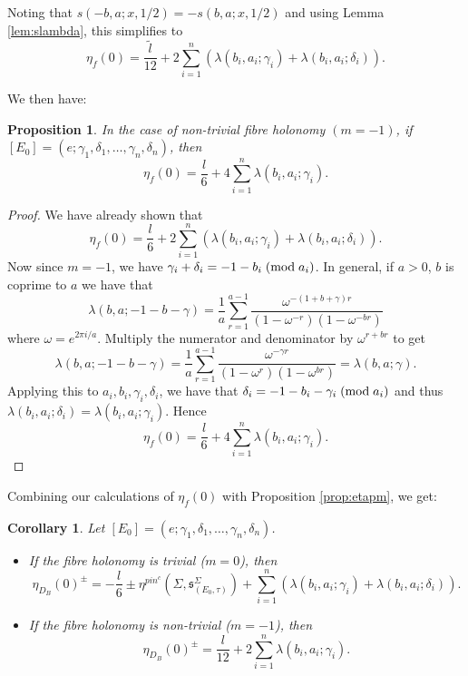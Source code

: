 \documentclass{amsart}
\newtheorem{corollary}[theorem]{Corollary}
\newtheorem{proposition}[theorem]{Proposition}
\theoremstyle{definition}
\theoremstyle{remark}
\numberwithin{equation}{section}
\begin{document}
Noting that $s(-b,a ; x , 1/2) = -s(b,a ; x , 1/2)$ and using Lemma \ref{lem:slambda}, this simplifies to
\[
\eta_f(0) = \frac{\widetilde{l}}{12} + 2 \sum_{i=1}^{n} \left( \lambda(b_i,a_i;\gamma_i) + \lambda(b_i,a_i;\delta_i) \right).
\]

We then have:
\begin{proposition}
In the case of non-trivial fibre holonomy $(m=-1)$, if $[E_0] = (e ; \gamma_1 , \delta_1 , \dots , \gamma_n , \delta_n)$, then
\[
\eta_f(0) = \frac{l}{6} + 4 \sum_{i=1}^n \lambda(b_i , a_i ; \gamma_i).
\]
\end{proposition}
\begin{proof}
We have already shown that
\[
\eta_f(0) = \frac{l}{6} + 2 \sum_{i=1}^{n} \left( \lambda(b_i,a_i;\gamma_i) + \lambda(b_i,a_i;\delta_i) \right).
\]
Now since $m=-1$, we have $\gamma_i + \delta_i = -1 - b_i \; ({\rm mod} \; a_i)$. In general, if $a > 0$, $b$ is coprime to $a$ we have that
\[
\lambda(b,a;-1-b-\gamma) = \frac{1}{a} \sum_{r=1}^{a-1} \frac{ \omega^{-(1+b+\gamma)r} }{(1-\omega^{-r})(1-\omega^{-br})}
\]
where $\omega = e^{2\pi i/a}$. Multiply the numerator and denominator by $\omega^{r+br}$ to get
\[
\lambda(b,a;-1-b-\gamma) = \frac{1}{a} \sum_{r=1}^{a-1} \frac{ \omega^{-\gamma r} }{(1-\omega^r)(1-\omega^{br})} = \lambda(b,a;\gamma).
\]
Applying this to $a_i,b_i,\gamma_i,\delta_i$, we have that $\delta_i = -1-b_i - \gamma_i \; ({\rm mod} \; a_i)$ and thus $\lambda(b_i,a_i;\delta_i) = \lambda(b_i,a_i;\gamma_i)$. Hence
\[
\eta_f(0) = \frac{l}{6} + 4 \sum_{i=1}^n \lambda(b_i , a_i ; \gamma_i).
\]
\end{proof}

Combining our calculations of $\eta_f(0)$ with Proposition \ref{prop:etapm}, we get:
\begin{corollary}
Let $[E_0] = (e ; \gamma_1 , \delta_1 , \dots , \gamma_n , \delta_n)$.
\begin{itemize}
\item[(1)]{If the fibre holonomy is trivial ($m=0$), then
\[
\eta_{D_B}(0)^{\pm} = -\frac{l}{6} \pm \eta^{pin^c}(\Sigma , \mathfrak{s}_{(E_0 , \tau)}^{\Sigma}) + \sum_{i=1}^n ( \lambda(b_i,a_i ; \gamma_i) + \lambda(b_i,a_i ; \delta_i) ).
\]
}
\item[(2)]{If the fibre holonomy is non-trivial ($m=-1$), then
\[
\eta_{D_B}(0)^{\pm} = \frac{l}{12} + 2 \sum_{i=1}^n \lambda(b_i , a_i ; \gamma_i).
\]
}
\end{itemize}
\end{corollary}
\end{document}
